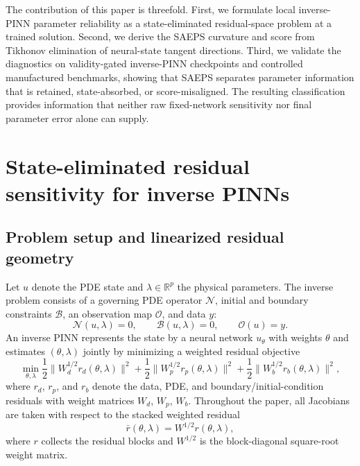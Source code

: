 \documentclass[preprint,12pt]{elsarticle}
\newcommand{\R}{\mathbb{R}}
\begin{document}
The contribution of this paper is threefold.  First, we formulate local inverse-PINN parameter reliability as a state-eliminated residual-space problem at a trained solution.  Second, we derive the SAEPS curvature and score from Tikhonov elimination of neural-state tangent directions.  Third, we validate the diagnostics on validity-gated inverse-PINN checkpoints and controlled manufactured benchmarks, showing that SAEPS separates parameter information that is retained, state-absorbed, or score-misaligned.  The resulting classification provides information that neither raw fixed-network sensitivity nor final parameter error alone can supply.

\section{State-eliminated residual sensitivity for inverse PINNs}

\subsection{Problem setup and linearized residual geometry}

Let $u$ denote the PDE state and $\lambda\in\R^p$ the physical parameters.  The inverse problem consists of a governing PDE operator $\mathcal N$, initial and boundary constraints $\mathcal B$, an observation map $\mathcal O$, and data $y$:
\begin{equation}
    \mathcal N(u,\lambda)=0,\qquad
    \mathcal B(u,\lambda)=0,\qquad
    \mathcal O(u)=y.
    \label{eq:pde_inverse_problem}
\end{equation}
An inverse PINN represents the state by a neural network $u_\theta$ with weights $\theta$ and estimates $(\theta,\lambda)$ jointly by minimizing a weighted residual objective
\begin{equation}
    \min_{\theta,\lambda}
    \frac12\|W_d^{1/2}r_d(\theta,\lambda)\|^2
    +\frac12\|W_p^{1/2}r_p(\theta,\lambda)\|^2
    +\frac12\|W_b^{1/2}r_b(\theta,\lambda)\|^2,
    \label{eq:pinn_training_objective}
\end{equation}
where $r_d$, $r_p$, and $r_b$ denote the data, PDE, and boundary/initial-condition residuals with weight matrices $W_d$, $W_p$, $W_b$.  Throughout the paper, all Jacobians are taken with respect to the stacked weighted residual
\begin{equation}
    \bar r(\theta,\lambda)=W^{1/2}r(\theta,\lambda),
    \label{eq:weighted_residual}
\end{equation}
where $r$ collects the residual blocks and $W^{1/2}$ is the block-diagonal square-root weight matrix.
\end{document}
